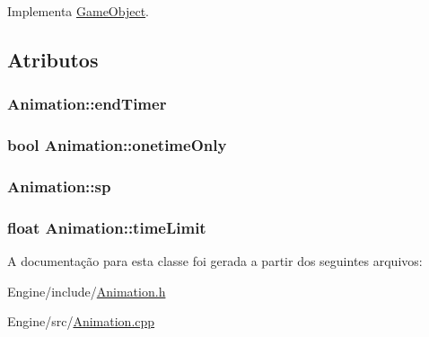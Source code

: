 Implementa \hyperlink{classGameObject_a93ed63df640deb516a020530e7f8e045}{Game\+Object}.



\subsection{Atributos}
\hypertarget{classAnimation_ad4e2674025e4f91143e574c09e213e38}{
\subsubsection[{end\+Timer}]{ Animation\+::end\+Timer\hspace{0.3cm}{\ttfamily [private]}}}\label{classAnimation_ad4e2674025e4f91143e574c09e213e38}
\hypertarget{classAnimation_aa8be050af14ac86c2cce45908bae750d}{
\subsubsection[{onetime\+Only}]{\setlength{\rightskip}{0pt plus 5cm}bool Animation\+::onetime\+Only\hspace{0.3cm}{\ttfamily [private]}}}\label{classAnimation_aa8be050af14ac86c2cce45908bae750d}
\hypertarget{classAnimation_abf968c115c1d8c88da797215d58ad516}{
\subsubsection[{sp}]{ Animation\+::sp\hspace{0.3cm}{\ttfamily [private]}}}\label{classAnimation_abf968c115c1d8c88da797215d58ad516}
\hypertarget{classAnimation_ab8b4a075f8bf097b7af6e732949235c6}{
\subsubsection[{time\+Limit}]{\setlength{\rightskip}{0pt plus 5cm}float Animation\+::time\+Limit\hspace{0.3cm}{\ttfamily [private]}}}\label{classAnimation_ab8b4a075f8bf097b7af6e732949235c6}


A documentação para esta classe foi gerada a partir dos seguintes arquivos\+:\begin{DoxyCompactItemize}
\item 
Engine/include/\hyperlink{Animation_8h}{Animation.\+h}\item 
Engine/src/\hyperlink{Animation_8cpp}{Animation.\+cpp}\end{DoxyCompactItemize}
